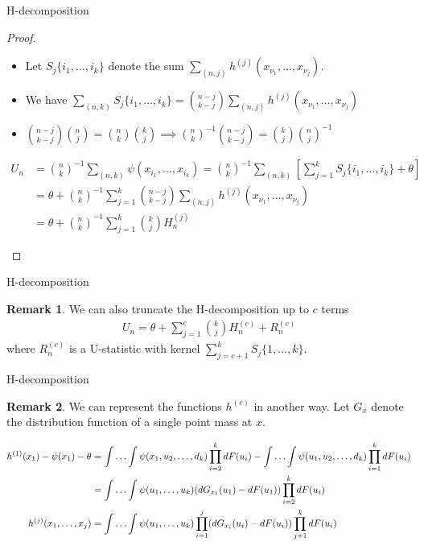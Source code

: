 \documentclass{beamer}
\theoremstyle{definition}
\numberwithin{Def}{section}
\newtheorem{Rmk}{Remark}
\begin{document}
\begin{frame}{H-decomposition}
\begin{proof}
\begin{itemize}
    \item Let $S_j\{i_1, \dotsc, i_k\}$ denote the sum $\sum_{(n,j)} h^{(j)}(x_{\nu_1}, \dotsc, x_{\nu_j})$. 
    \item We have $\sum_{(n,k)}S_j\{i_1, \dotsc, i_k\} = {n-j \choose k-j}\sum_{(n,j)}h^{(j)}(x_{\nu_1}, \dotsc, x_{\nu_j})$ 
    \item  ${n-j \choose k-j}{n \choose j} = {n \choose k}{k \choose j} \implies {n \choose k}^{-1}{n-j \choose k-j} = {k \choose j}{n \choose j}^{-1}$
\end{itemize}
\begin{fontsize}{10}{12}
\begin{align*}
    U_n &= {n \choose k}^{-1}\sum_{(n,k)}\psi(x_{i_1}, \dotsc, x_{i_k}) = {n \choose k}^{-1}\sum_{(n,k)}\left[\sum_{j=1}^kS_j\{i_1, \dotsc, i_k\} + \theta \right] \\
    &= \theta + {n \choose k}^{-1}\sum_{j=1}^k{n-j \choose k-j}\sum_{(n,j)}h^{(j)}(x_{\nu_1}, \dotsc, x_{\nu_j}) \\
    &= \theta + {n \choose k}^{-1}\sum_{j=1}^k{k \choose j}H_n^{(j)}
\end{align*}
\end{fontsize}
\end{proof}    
\end{frame}

\begin{frame}{H-decomposition}
\begin{Rmk}
We can also truncate the H-decomposition up to $c$ terms 
\begin{align}
    U_n = \theta + \sum_{j=1}^c{k \choose j} H_n^{(c)} + R_n^{(c)}
\end{align}
where $R_n^{(c)}$ is a U-statistic with kernel $\sum_{j=c+1}^k S_j\{1, \dotsc, k\}$.  
\end{Rmk}
\end{frame}

\begin{frame}{H-decomposition}
\begin{Rmk}
We can represent the functions $h^{(c)}$ in another way. Let $G_x$ denote the distribution function of a single point mass at $x$. 
\begin{fontsize}{6.5}{12}
\begin{align}
    h^{(1)}(x_1) - \psi(x_1) - \theta  &= \int \dotsc \int \psi(x_1, u_2, \dotsc, d_k)\prod_{i=2}^k dF(u_i) - \int \dotsc \int \psi(u_1, u_2, \dotsc, d_k)\prod_{i=1}^k dF(u_i) \notag \\
    &= \int \dotsc \int \psi(u_1, \dotsc, u_k)(dG_{x_1}(u_1) - dF(u_1))\prod_{i=2}^k dF(u_i) \notag \\
    h^{(j)}(x_1, \dotsc, x_j) &= \int \dotsc \int \psi(u_1, \dotsc, u_k) \prod_{i=1}^j(dG_{x_i}(u_i) - dF(u_i))\prod_{j+1}^kdF(u_i) \label{h_func_rep}
\end{align}
\end{fontsize}
\end{Rmk}    
\end{frame}
\end{document}
